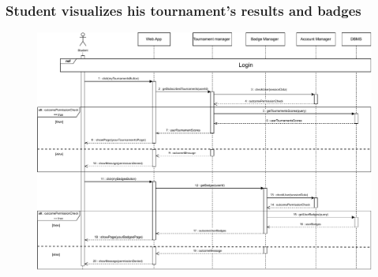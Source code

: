 \documentclass{article}
\begin{document}
{    \subsubsection{Student visualizes his tournament's results and badges}
        \begin{figure}[H]
            \centering
            \hspace*{-2.9cm}\includegraphics[scale=0.65]{Sequence/Sequence13DD.pdf}
            \caption{}
            \label{fig:Sequence13DD}
        \end{figure}

        

}
\end{document}
